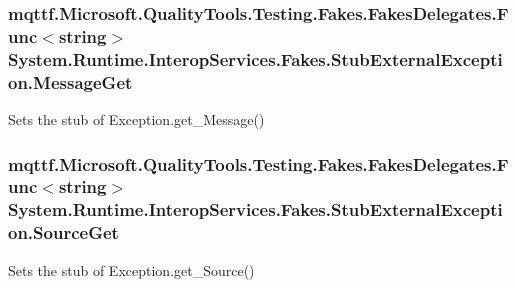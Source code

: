 \hypertarget{class_system_1_1_runtime_1_1_interop_services_1_1_fakes_1_1_stub_external_exception_a8d0cafa28fdc6e54db3598ee82d0f230}{
\subsubsection[{Message\-Get}]{\setlength{\rightskip}{0pt plus 5cm}mqttf.\-Microsoft.\-Quality\-Tools.\-Testing.\-Fakes.\-Fakes\-Delegates.\-Func$<$string$>$ System.\-Runtime.\-Interop\-Services.\-Fakes.\-Stub\-External\-Exception.\-Message\-Get}}\label{class_system_1_1_runtime_1_1_interop_services_1_1_fakes_1_1_stub_external_exception_a8d0cafa28fdc6e54db3598ee82d0f230}


Sets the stub of Exception.\-get\-\_\-\-Message()

\hypertarget{class_system_1_1_runtime_1_1_interop_services_1_1_fakes_1_1_stub_external_exception_ab04b7efdf156d8a6d81015ddb34d78dc}{
\subsubsection[{Source\-Get}]{\setlength{\rightskip}{0pt plus 5cm}mqttf.\-Microsoft.\-Quality\-Tools.\-Testing.\-Fakes.\-Fakes\-Delegates.\-Func$<$string$>$ System.\-Runtime.\-Interop\-Services.\-Fakes.\-Stub\-External\-Exception.\-Source\-Get}}\label{class_system_1_1_runtime_1_1_interop_services_1_1_fakes_1_1_stub_external_exception_ab04b7efdf156d8a6d81015ddb34d78dc}


Sets the stub of Exception.\-get\-\_\-\-Source()

